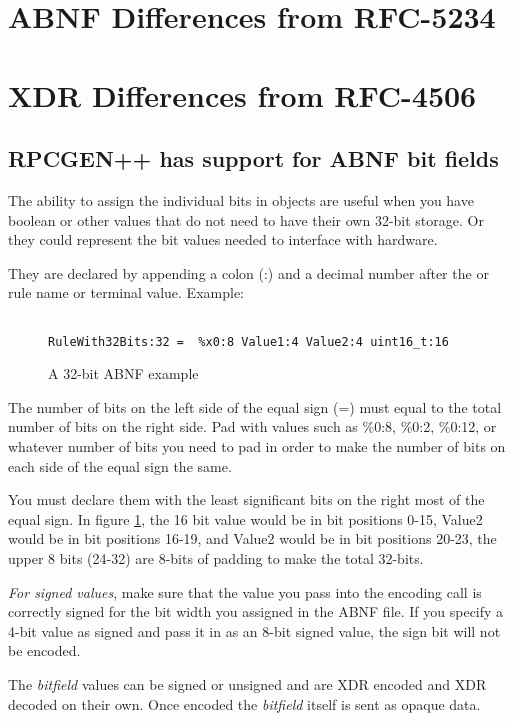 \section{ABNF Differences from RFC-5234}
\section{XDR Differences from RFC-4506}

\subsection{RPCGEN++ has support for ABNF bit fields}
The ability to assign the individual bits in objects are useful
when you have boolean or other values that do not need to have
their own 32-bit storage.
Or they could represent the bit values needed to interface
with hardware.

They are declared by appending a colon (:) and a decimal number
after the or rule name or terminal value. Example:

\begin{figure}
\begin{verbatim}

RuleWith32Bits:32 =  %x0:8 Value1:4 Value2:4 uint16_t:16

\end{verbatim}
\caption{A 32-bit ABNF example}
\label{fig:A32BitExampleABNF}
\end{figure}

The number of bits on the left side of the equal sign (=)
must equal to the total number of bits on the right side.
Pad with values such as \%0:8, \%0:2, \%0:12, or whatever number
of bits you need to pad in order to make the number of bits
on each side of the equal sign the same.

You must declare them with the least significant bits on
the right most of the equal sign.
In figure \ref{fig:A32BitExampleABNF}, the 16 bit
value would be in bit positions 0-15, Value2 would
be in bit positions 16-19, and Value2 would be in bit
positions 20-23, the upper 8 bits (24-32) are 8-bits
of padding to make the total 32-bits.

\textit{For signed values}, make sure that the value you pass
into the encoding call is correctly signed for the bit
width you assigned in the ABNF file.
If you specify a 4-bit value as signed
and pass it in as an 8-bit signed value, the sign bit will not
be encoded.

The \textit{bitfield} values can be signed or unsigned and
are XDR encoded and XDR decoded on their own.
Once encoded the \textit{bitfield} itself is sent as
opaque data.

